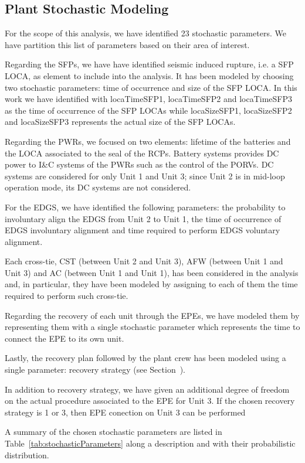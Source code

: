 \subsection{Plant Stochastic Modeling}
For the scope of this analysis, we have identified 23 stochastic parameters. We have 
partition this list of parameters based on their area of interest.

Regarding the SFPs, we have have identified seismic induced rupture, i.e. a SFP LOCA, as 
element to include into the analysis. It has been modeled by choosing two stochastic 
parameters: time of  occurrence and size of the SFP LOCA. In this work we have identified 
with locaTimeSFP1, locaTimeSFP2 and locaTimeSFP3 as the time of occurrence of the SFP 
LOCAs while locaSizeSFP1, locaSizeSFP2 and locaSizeSFP3 represents the actual size of 
the SFP LOCAs.

Regarding the PWRs, we focused on two elements: lifetime of the batteries and the LOCA 
associated to the seal of the RCPs. Battery systems provides DC power to I\&C systems 
of the PWRs such as the control of the PORVs. DC systems are considered for only 
Unit 1 and Unit 3; since Unit 2 is in mid-loop operation mode, its DC systems are not 
considered.

For the EDGS, we have identified the following parameters: the probability to 
involuntary align the EDGS from Unit 2 to Unit 1, the time of occurrence of EDGS
involuntary alignment and time required to perform EDGS voluntary alignment.  

Each cross-tie, CST (between Unit 2 and Unit 3), AFW (between Unit 1 and Unit 3) 
and AC (between Unit 1 and Unit 1), has been considered in the analysis and, in 
particular, they have been modeled by assigning to each of them the time required 
to perform such cross-tie.

Regarding the recovery of each unit through the EPEs, we have modeled them by 
representing them with a single stochastic parameter which represents the
time to connect the EPE to its own unit.

Lastly, the recovery plan followed by the plant crew has been modeled using a single
parameter: recovery strategy (see Section~\cite{sec:accidentProgression}).

In addition to recovery strategy, we have given an additional degree of freedom on 
the actual procedure associated to the EPE for Unit 3. 
If the chosen recovery strategy is 1 or 3, then EPE conection on Unit 3 can be performed  

A summary of the chosen stochastic parameters are listed in Table~\ref{tab:stochasticParameters} 
along a description and with their probabilistic distribution.

